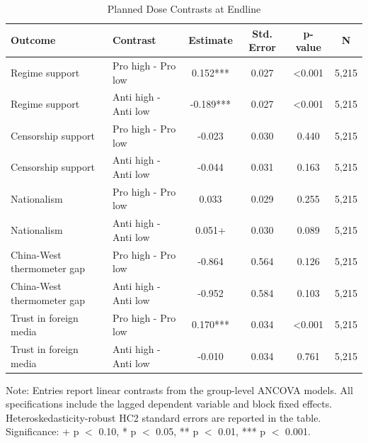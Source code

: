 \begin{table}[H]
\centering
\caption{Planned Dose Contrasts at Endline}
\label{tab:planned_contrasts_t1}
\footnotesize
\begin{threeparttable}
\begin{tabular}{llcccc}
\toprule
Outcome & Contrast & Estimate & Std. Error & p-value & N \\
\midrule
Regime support & Pro high - Pro low & 0.152*** & 0.027 & <0.001 & 5,215 \\
Regime support & Anti high - Anti low & -0.189*** & 0.027 & <0.001 & 5,215 \\
Censorship support & Pro high - Pro low & -0.023 & 0.030 & 0.440 & 5,215 \\
Censorship support & Anti high - Anti low & -0.044 & 0.031 & 0.163 & 5,215 \\
Nationalism & Pro high - Pro low & 0.033 & 0.029 & 0.255 & 5,215 \\
Nationalism & Anti high - Anti low & 0.051+ & 0.030 & 0.089 & 5,215 \\
China-West thermometer gap & Pro high - Pro low & -0.864 & 0.564 & 0.126 & 5,215 \\
China-West thermometer gap & Anti high - Anti low & -0.952 & 0.584 & 0.103 & 5,215 \\
Trust in foreign media & Pro high - Pro low & 0.170*** & 0.034 & <0.001 & 5,215 \\
Trust in foreign media & Anti high - Anti low & -0.010 & 0.034 & 0.761 & 5,215 \\
\bottomrule
\end{tabular}
\begin{tablenotes}[flushleft]
\footnotesize
\item Note: Entries report linear contrasts from the group-level ANCOVA models. All specifications include the lagged dependent variable and block fixed effects. Heteroskedasticity-robust HC2 standard errors are reported in the table. Significance: + p $<$ 0.10, * p $<$ 0.05, ** p $<$ 0.01, *** p $<$ 0.001.
\end{tablenotes}
\end{threeparttable}
\end{table}
